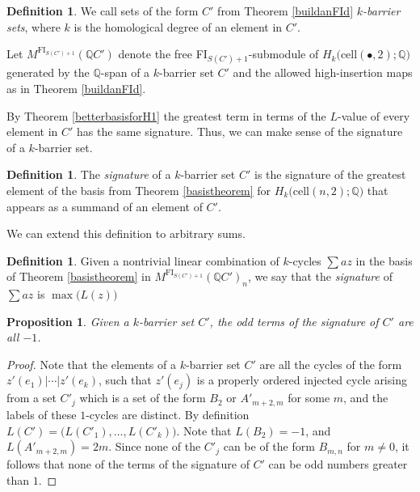 \documentclass[12py]{amsart}%
\newtheorem{prop}[thm]{Proposition}
\theoremstyle{definition}\newtheorem{definition}[thm]{Definition}
\theoremstyle{definition}
\newtheorem{defn}[thm]{Definition}
\newcommand{\Q}{\ensuremath{\mathbb{Q}}}
\begin{document}
\begin{defn}
We call sets of the form $C'$ from Theorem \ref{buildanFId} \emph{$k$-barrier sets}, where $k$ is the homological degree of an element in $C'$.
\end{defn}

Let $M^{\text{FI}_{S(C')+1}}(\Q C')$ denote the free FI$_{S(C')+1}$-submodule of $H_{k}\big(\text{cell}(\bullet, 2);\Q\big)$ generated by the $\Q$-span of a $k$-barrier set $C'$ and the allowed high-insertion maps as in Theorem \ref{buildanFId}.

By Theorem \ref{betterbasisforH1} the greatest term in terms of the $L$-value of every element in $C'$ has the same signature. Thus, we can make sense of the signature of a $k$-barrier set.

\begin{defn}
The \emph{signature} of a $k$-barrier set $C'$ is the signature of the greatest element of the basis from Theorem \ref{basistheorem} for $H_{k}\big(\text{cell}(n,2);\Q\big)$ that appears as a summand of an element of $C'$.
\end{defn}

We can extend this definition to arbitrary sums.

\begin{defn}
Given a nontrivial linear combination of $k$-cycles $\sum az$ in the basis of Theorem \ref{basistheorem} in $M^{\text{FI}_{S(C')+1}}(\Q C')_{n}$, we say that the \emph{signature} of $\sum az$ is $\max\big(L(z)\big)$
\end{defn}

\begin{prop}\label{neg1}
Given a $k$-barrier set $C'$, the odd terms of the signature of $C'$ are all $-1$.
\end{prop}

\begin{proof}
Note that the elements of a $k$-barrier set $C'$ are all the cycles of the form $z'(e_{1})|\cdots|z'(e_{k})$, such that $z'(e_{j})$ is a properly ordered injected cycle arising from a set $C'_{j}$ which is a set of the form $B_{2}$ or $A'_{m+2,m}$ for some $m$, and the labels of these $1$-cycles are distinct. By definition $L(C')=\big(L(C'_{1}),\dots, L(C'_{k})\big)$. Note that $L(B_{2})=-1$, and $L(A'_{m+2, m})=2m$. Since none of the $C'_{j}$ can be of the form $B_{m,n}$ for $m\neq 0$, it follows that none of the terms of the signature of $C'$ can be odd numbers greater than $1$.
\end{proof}
\end{document}
